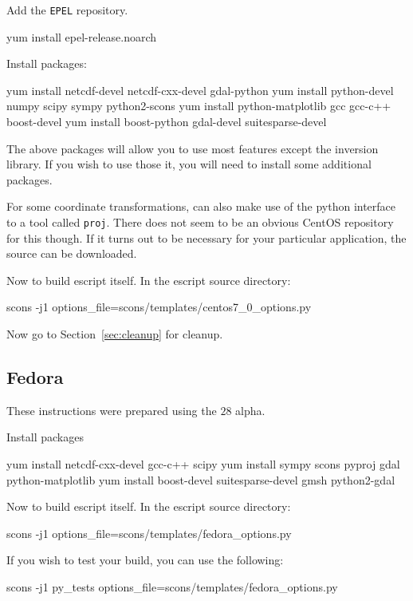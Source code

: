 \noindent Add the \texttt{EPEL} repository.
\begin{shellCode}
yum install epel-release.noarch
\end{shellCode}

\noindent Install packages:
\begin{shellCode}
yum install netcdf-devel netcdf-cxx-devel gdal-python
yum install python-devel numpy scipy sympy python2-scons
yum install python-matplotlib gcc gcc-c++ boost-devel
yum install boost-python gdal-devel suitesparse-devel
\end{shellCode}

The above packages will allow you to use most features except 
the \downunder inversion library.
If you wish to use those it, you will need to install some additional packages.

\noindent For some coordinate transformations, \downunder can also make use of the python interface to a tool called \texttt{proj}.
There does not seem to be an obvious CentOS repository for this though.
If it turns out to be necessary for your particular application, the source can be downloaded. 

\noindent Now to build escript itself.
In the escript source directory:
\begin{shellCode}
scons -j1 options_file=scons/templates/centos7_0_options.py
\end{shellCode}

\noindent Now go to Section~\ref{sec:cleanup} for cleanup.

\subsection{Fedora}\label{sec:fedorasrc}
These instructions were prepared using the $28$ alpha.

\noindent Install packages
\begin{shellCode}
yum install netcdf-cxx-devel gcc-c++ scipy 
yum install sympy scons pyproj gdal python-matplotlib 
yum install boost-devel suitesparse-devel gmsh python2-gdal
\end{shellCode}

\noindent Now to build escript itself.
In the escript source directory:
\begin{shellCode}
scons -j1 options_file=scons/templates/fedora_options.py
\end{shellCode}

\noindent If you wish to test your build, you can use the following:
\begin{shellCode}
scons -j1 py_tests options_file=scons/templates/fedora_options.py 
\end{shellCode}

